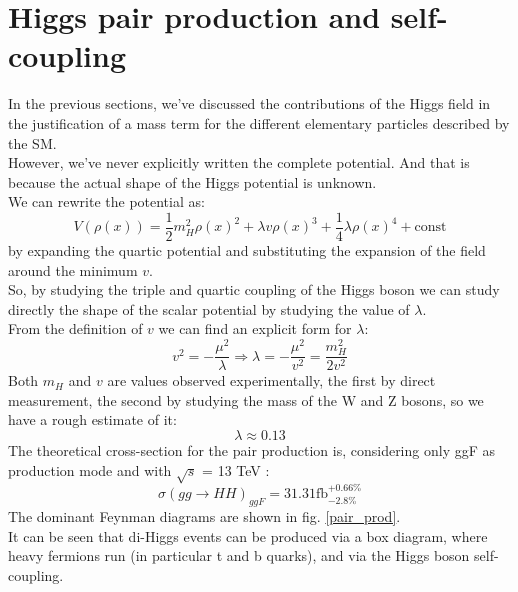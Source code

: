 \section{Higgs pair production and self-coupling}
In the previous sections, we've discussed the contributions of the Higgs field in the justification of a mass term for the different elementary particles described by the SM.\\
However, we've never explicitly written the complete potential.
And that is because the actual shape of the Higgs potential is unknown.\\
We can rewrite the potential as:
\begin{equation}
    V(\rho(x)) = \frac{1}{2}m_H^2\rho(x)^2 +\lambda v \rho(x)^3 + \frac{1}{4}\lambda\rho(x)^4 +\text{const}
\end{equation}
by expanding the quartic potential and substituting the expansion of the field around the minimum $v$.\\
So, by studying the triple and quartic coupling of the Higgs boson we can study directly the shape of the scalar potential by studying the value of $\lambda$.\\
From the definition of $v$ we can find an explicit form for $\lambda$:
\begin{equation}
    v^2 = -\dfrac{\mu^2}{\lambda} \Longrightarrow \lambda = -\dfrac{\mu^2}{v^2} = \dfrac{m_H^2}{2v^2} 
\end{equation}
Both $m_H$ and $v$ are values observed experimentally, the first by direct measurement, the second by studying the mass of the W and Z bosons, so we have a rough estimate of it:
\begin{equation}
    \lambda \approx 0.13
\end{equation}
The theoretical cross-section for the pair production is, considering only ggF as production mode and with $\sqrt{s}$ = 13 TeV \cite{theoretical_pair_prod}:
\begin{equation}
    \sigma(gg\longrightarrow H H )_{ggF} = 31.31 \text{fb}^{+0.66\%}_{-2.8\%}
\end{equation}
The dominant Feynman diagrams are shown in fig. \ref{pair_prod}. \\
It can be seen that di-Higgs events can be produced via a box diagram, where heavy fermions run (in particular t and b quarks), and via the Higgs boson self-coupling.\\
